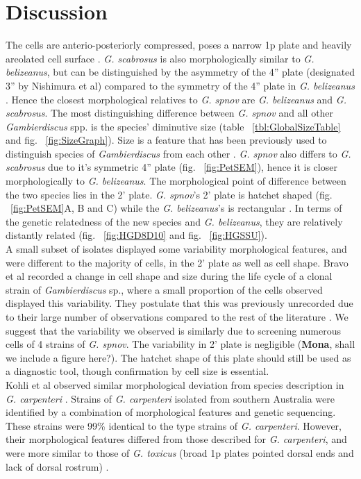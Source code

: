 \documentclass[12pt]{article}
\begin{document}
\newpage
\section{Discussion}
The cells are anterio-posteriorly compressed, poses a narrow 1p plate and heavily areolated cell surface \citep{litaker2009taxonomy}. \emph{G. scabrosus} is also morphologically similar to \emph{G. belizeanus}, but can be distinguished by the asymmetry of the 4'' plate (designated 3'' by Nishimura et al) compared to the symmetry of the 4'' plate in \emph{G. belizeanus} \citep{nishimura2014morphology}. Hence the closest morphological relatives to \emph{G. spnov} are \emph{G. belizeanus} and \emph{G. scabrosus}. The most distinguishing difference between \emph{G. spnov} and all other \emph{Gambierdiscus} spp. is the species' diminutive size (table ~\ref{tbl:GlobalSizeTable} and fig. ~\ref{fig:SizeGraph}). Size is a feature that has been previously used to distinguish species of \emph{Gambierdiscus} from each other \citep{litaker2009taxonomy}. 
\emph{G. spnov} also differs to \emph{G. scabrosus} due to it's symmetric 4'' plate (fig. ~\ref{fig:PetSEM}), hence it is closer morphologically to \emph{G. belizeanus}. The morphological point of difference between the two species lies in the 2' plate. \emph{G. spnov}'s 2' plate is hatchet shaped (fig. ~\ref{fig:PetSEM}A, B and C) while the \emph{G. belizeanus}'s is rectangular \citep{faust1995observation}. In terms of the genetic relatedness of the new species and \textit{G. belizeanus}, they are relatively distantly related (fig. ~\ref{fig:HGD8D10} and fig. ~\ref{fig:HGSSU}). \\
A small subset of isolates displayed some variability morphological features, and were different to the majority of cells, in the 2' plate as well as cell shape. Bravo et al recorded a change in cell shape and size during the life cycle of a clonal strain of \emph{Gambierdiscus} sp., where a small proportion of the cells observed displayed this variability. They postulate that this was previously unrecorded due to their large number of observations compared to the rest of the literature \citep{bravo2014cellular}. We suggest that the variability we observed is similarly due to screening numerous cells of 4 strains of \emph{G. spnov}. The variability in 2' plate is negligible (\textbf{Mona}, shall we include a figure here?). The hatchet shape of this plate should still be used as a diagnostic tool, though confirmation by cell size is essential.\\
Kohli et al observed similar morphological deviation from species description in  \emph{G. carpenteri} \citep{kohli2014high}. Strains of \emph{G. carpenteri} isolated from southern Australia were identified by a combination of morphological features and genetic sequencing. These strains were 99\% identical to the type strains of \textit{G. carpenteri}. However, their morphological features differed from those described for \textit{G. carpenteri}, and were more similar to those of \emph{G. toxicus} (broad 1p plates pointed dorsal ends and lack of dorsal rostrum) \citep{kohli2014high,litaker2009taxonomy}.
\end{document}
